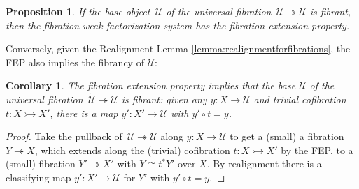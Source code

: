 \documentclass[12pt]{article}
\newcommand{\CC}{\ensuremath{\mathcal{C}}}
\newcommand{\Set}{\ensuremath{\mathsf{Set}}}
\newcommand{\mono}{\ensuremath{\rightarrowtail}}
\newcommand{\ra}{\ensuremath{\rightarrow}}
\newcommand{\cof}{\ensuremath{\rightarrowtail}}
\newcommand{\fib}{\ensuremath{\twoheadrightarrow}}
\newcommand{\onto}{\ensuremath{\twoheadrightarrow}}
\newcommand{\I}{\ensuremath{\mathrm{I}}}
\newcommand{\U}{\ensuremath{\mathcal{U}}}
\newcommand{\UU}{\ensuremath{\,\dot{\mathcal{U}}}}
\newtheorem{proposition}[theorem]{Proposition}
\newtheorem{corollary}[theorem]{Corollary}
\theoremstyle{remark}
\theoremstyle{definition}
\begin{document}
\begin{proposition}\label{prop:UfibtoFEP}
If the base object $\,\U$ of the universal fibration $\UU\fib\U$ is fibrant, then the fibration weak factorization system has the fibration extension property.
\end{proposition}

Conversely, given the Realignment Lemma \ref{lemma:realignmentforfibrations}, the FEP also implies the fibrancy of $\U$:

\begin{corollary}
The fibration extension property implies that the base $\U$ of the universal fibration $\UU\fib\U$ is fibrant: given any $y : X \ra \U$ and trivial cofibration $t : X\cof X'$, there is a map $y' : X' \ra \U$  with $y'\circ t = y$.
\end{corollary}

\begin{proof}
Take the pullback of $\UU\fib\U$ along $y : X \ra \U$ to get a (small) a fibration $Y\fib X$, which extends along the (trivial) cofibration $t : X\cof X'$ by the FEP,  to a (small) fibration $Y'\onto X'$ with $Y \cong t^*Y'$ over $X$.  By realignment there is a classifying map $y' : X' \ra \U$ for $Y'$ with $y'\circ t = y$.
\end{proof}

%
%
\end{document}
